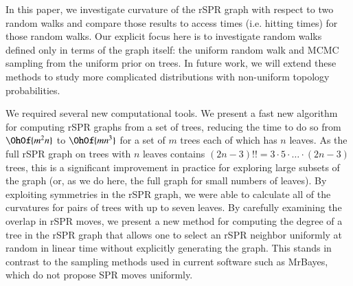 \documentclass[]{elsarticle}
\begin{document}
In this paper, we investigate curvature of the rSPR graph with respect to two random walks and compare those results to access times (i.e. hitting times) for those random walks.
Our explicit focus here is to investigate random walks defined only in terms of the graph itself: the uniform random walk and MCMC sampling from the uniform prior on trees.
In future work, we will extend these methods to study more complicated distributions with non-uniform topology probabilities.

We required several new computational tools.
We present a fast new algorithm for computing rSPR graphs from a set of trees, reducing the time to do so from $\OhOf{m^2n}$ to $\OhOf{mn^3}$ for a set of $m$ trees each of which has $n$ leaves.
As the full rSPR graph on trees with $n$ leaves contains $(2n-3)!! = 3 \cdot 5 \cdot \ldots \cdot (2n-3)$ trees, this is a significant improvement in practice for exploring large subsets of the graph (or, as we do here, the full graph for small numbers of leaves).
By exploiting symmetries in the rSPR graph, we were able to calculate all of the curvatures for pairs of trees with up to seven leaves.
By carefully examining the overlap in rSPR moves, we present a new method for computing the degree of a tree in the rSPR graph that allows one to select an rSPR neighbor uniformly at random in linear time without explicitly generating the graph.
This stands in contrast to the sampling methods used in current software such as MrBayes, which do not propose SPR moves uniformly.
\end{document}
